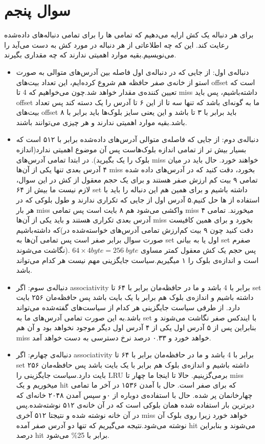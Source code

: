 \documentclass[11pt]{article}
\begin{document}
\section{سوال پنجم}
برای هر دنباله
یک کش ارایه می‌دهیم که تمامی
ها را برای تمامی دنباله‌های داده‌شده رعایت کند. این که چه اطلاعاتی از هر دنباله در مورد کش به دست می‌آید را می‌نویسیم.بقیه موارد اهمیتی ندارند که چه مقداری بگیرند.
\begin{itemize}
\item دنباله‌‌ی اول:
از جایی که در دنباله‌ی اول فاصله‌ بین آدرس‌های متوالی به صورت
استو از خانه‌‌ی صفر حافظه هم شروع کرده‌ایم، این تعداد بیت‌های offset است که تعیین کننده‌ی مقدار 
خواهد شد.چون می‌خواهیم که 4 تا miss داشته‌باشیم، پس باید offset ما به گونه‌ای باشد که تنها سه تا از این ۶ تا آدرس را یک دسته کند پس تعداد بیت‌های offset باید برابر با ۳ تا باشد و این یعنی سایز بلوک‌ها باید برابر با ۸ باشد.بقیه موارد اهمیتی ندارند و هر چیزی می‌توانند باشند.
\item دنباله‌ی دوم:
از جایی که فاصله‌ی متوالی آدرس‌های داده‌شده برابر با ۵۱۲ است که بسیار بیش تر از تمامی اندازه بلوک‌هاست پس آن موضوع اهمیتی ندارد(اندازه بلوک را یک بگیرید). در ابتدا تمامی آدرس‌های 
miss خواهند خورد.
حال باید در میان ۴ آدرس بعدی تنها یکی از آن‌ها miss بخورد، دقت کنید که در آدرس‌های داده شده تمامی ۹ بیت کم ارزش صفر هستند و برای یک حجم معقول از کش در این سوال، لازم نیست ما بیش از ۶۴ set داشته باشیم و برای همین هم این دنباله را باید با استفاده از 
ها حل کنیم.۵ آدرس اول از جایی که تکراری ندارند و طول بلوکی که در هر بار miss واکشی می‌شود هم ۸ بایت است پس تمامی miss میخورند. تمامی ۴ آدرس بعدی تکراری هستند و باید یکی از آن‌ها miss بخورد و برای همین کافیست که 
داشته‌باشیم(دقت کنید چون ۹ بیت کم‌ارزش تمامی آدرس‌های خواسته‌شده در صورت سوال برابر صفر است پس تمامی آن‌ها به set اول یا به بیانی set صفر‌م نگاشت می‌شوند).
پس حجم یک کش معقول کمتر مساوی 
$64 \times 4 byte = 256\;byte$
است و اندازه‌ی بلوک را ۱ میگیریم.سیاست جایگزینی مهم نیست هر کدام می‌تواند باشد.
\item دنباله‌ی سوم:
اگر associativity برابر با 4 باشد و ما در حافظه‌مان برابر با ۶۴ تا set داشته باشیم و اندازه‌‌‌ی بلوک هم برابر با یک بایت باشد پس حافظه‌مان ۲۵۶ بایت دارد. از طرفی سیاست جایگزینی هر‌ کدام از سیاست‌های گفته‌شده می‌تواند باشد.به این صورت تمامی آدرس‌های ما به set با ایندکس صفر نگاشت می‌شوند و بنابراین پس از ۵ آدرس اول یکی از ۴ آدرس اول دیگر موجود نخواهد بود و آن هم miss خواهد خورد و ۰.۳۳ درصد نرخ دسترسی به دست خواهد‌ آمد.
\item دنباله‌ی چهارم:
اگر associativity برابر با 4 باشد و ما در حافظه‌مان برابر با ۶۴ تا set داشته باشیم و اندازه‌‌‌ی بلوک هم برابر با یک بایت باشد پس حافظه‌مان ۲۵۶ بایت دارد.سیاست جایگزینی را LRU برمی‌گزینیم. حالا
تا اینجا  
ما چهار تا miss میخوریم و یک hit که برای صفر است. حال با آمدن ۱۵۳۶ در آخر ما تمامی چهارخانمان پر شده. حال با استفاده‌ی دوباره از ۰و سپس آمدن ۲۰۴۸ خانه‌ای که دیرترین بار استفاده شده همان بلوکی است که در آن خانه‌ی ۵۱۲ نوشته‌شده.پس در آن خانه نوشته شده و نتیجتا ۵۱۲ آخری miss خواهد خورد زیرا روی بلوک آن نوشته‌ می‌شود.نتیجه می‌گیریم که تنها دو آدرس صفر آمده hit می‌شوند و بنابراین درصد hit برابر با 25\% می‌شود.
\end{itemize}
\end{document}
